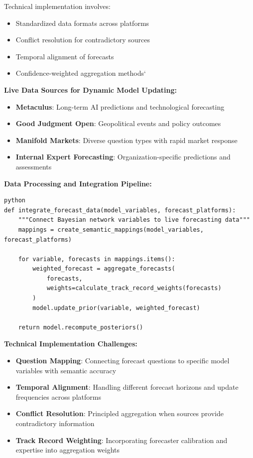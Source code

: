 \documentclass[
  11pt,
  letterpaper,
]{book}
\providecommand{\tightlist}{%
  \setlength{\itemsep}{0pt}\setlength{\parskip}{0pt}}
\begin{document}
Technical implementation involves:

\begin{itemize}
\tightlist
\item
  Standardized data formats across platforms
\item
  Conflict resolution for contradictory sources
\item
  Temporal alignment of forecasts
\item
  Confidence-weighted aggregation methods`
\end{itemize}

\textbf{Live Data Sources for Dynamic Model Updating:}

\begin{itemize}
\tightlist
\item
  \textbf{Metaculus}: Long-term AI predictions and technological
  forecasting
\item
  \textbf{Good Judgment Open}: Geopolitical events and policy outcomes
\item
  \textbf{Manifold Markets}: Diverse question types with rapid market
  response
\item
  \textbf{Internal Expert Forecasting}: Organization-specific
  predictions and assessments
\end{itemize}

\textbf{Data Processing and Integration Pipeline:}

\begin{verbatim}
python
def integrate_forecast_data(model_variables, forecast_platforms):
    """Connect Bayesian network variables to live forecasting data"""
    mappings = create_semantic_mappings(model_variables, forecast_platforms)
    
    for variable, forecasts in mappings.items():
        weighted_forecast = aggregate_forecasts(
            forecasts, 
            weights=calculate_track_record_weights(forecasts)
        )
        model.update_prior(variable, weighted_forecast)
    
    return model.recompute_posteriors()
\end{verbatim}

\textbf{Technical Implementation Challenges:}

\begin{itemize}
\tightlist
\item
  \textbf{Question Mapping}: Connecting forecast questions to specific
  model variables with semantic accuracy
\item
  \textbf{Temporal Alignment}: Handling different forecast horizons and
  update frequencies across platforms
\item
  \textbf{Conflict Resolution}: Principled aggregation when sources
  provide contradictory information
\item
  \textbf{Track Record Weighting}: Incorporating forecaster calibration
  and expertise into aggregation weights
\end{itemize}
\end{document}
